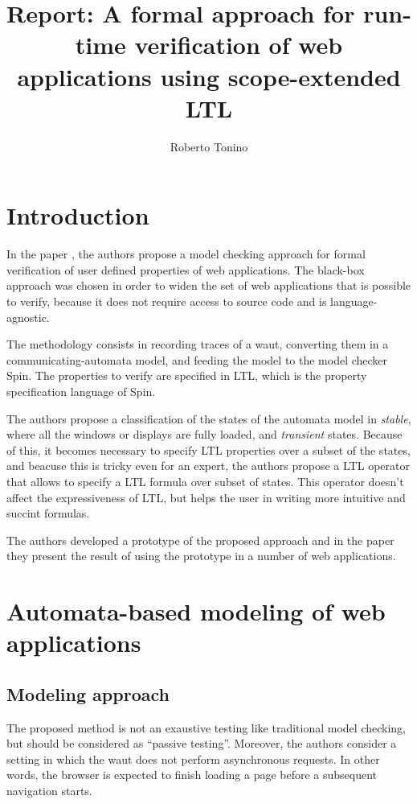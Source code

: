 \documentclass[a4paper,10pt]{article}
\title{Report: A formal approach for run-time verification of web applications using scope-extended LTL}
\author{Roberto Tonino}
\theoremstyle{plain} %
\theoremstyle{definition}
\theoremstyle{remark}
\begin{document}
\maketitle

\tableofcontents

\clearpage

\section{Introduction}
\label{introduction}

In the paper , the authors propose a model checking approach for formal verification of user defined properties of web applications. The black-box approach was chosen in order to widen the set of web applications that is possible to verify, because it does not require access to source code and is language-agnostic.

The methodology consists in recording traces of a \gls{waut}, converting them in a communicating-automata model, and feeding the model to the model checker Spin. The properties to verify are specified in LTL, which is the property specification language of Spin.

The authors propose a classification of the states of the automata model in \emph{stable}, where all the windows or displays are fully loaded, and \emph{transient} states.  Because of this, it becomes necessary to specify LTL properties over a subset of the states, and beacuse this is tricky even for an expert, the authors propose a LTL operator that allows to specify a LTL formula over subset of states. This operator doesn't affect the expressiveness of LTL, but helps the user in writing more intuitive and succint formulas.

The authors developed a prototype of the proposed approach and in the paper they present the result of using the prototype in a number of web applications.

\section{Automata-based modeling of web applications}
\label{automata-based-modeling-of-web-applications}


\subsection{Modeling approach}
\label{modeling-approach}

The proposed method is not an exaustive testing like traditional model checking, but should be considered as ``passive testing''. Moreover, the authors consider a setting in which the \gls{waut} does not perform asynchronous requests. In other words, the browser is expected to finish loading a page before a subsequent navigation starts.
\end{document}
